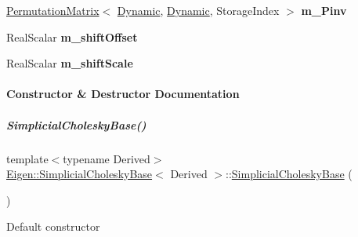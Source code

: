 \begin{DoxyCompactItemize}
\item 
\mbox{\label{group___sparse_cholesky___module_a764b103755408e66706abd16b8337a51}} 
\hyperlink{group___core___module_class_eigen_1_1_permutation_matrix}{Permutation\+Matrix}$<$ \hyperlink{namespace_eigen_ad81fa7195215a0ce30017dfac309f0b2}{Dynamic}, \hyperlink{namespace_eigen_ad81fa7195215a0ce30017dfac309f0b2}{Dynamic}, Storage\+Index $>$ {\bfseries m\+\_\+\+Pinv}
\item 
\mbox{\label{group___sparse_cholesky___module_a4e9e1aad9de3b3a66df7104d120a4331}} 
Real\+Scalar {\bfseries m\+\_\+shift\+Offset}
\item 
\mbox{\label{group___sparse_cholesky___module_ae7c80217fb99177ef501b19f75df6942}} 
Real\+Scalar {\bfseries m\+\_\+shift\+Scale}
\end{DoxyCompactItemize}


\paragraph{Constructor \& Destructor Documentation}
\mbox{\label{group___sparse_cholesky___module_a098baba1dbe07ca3a775c8df1f8a0e71}} 
\subparagraph{\texorpdfstring{Simplicial\+Cholesky\+Base()}{SimplicialCholeskyBase()}\hspace{0.1cm}{\footnotesize\ttfamily [1/2]}}
{\footnotesize\ttfamily template$<$typename Derived$>$ \\
\hyperlink{group___sparse_cholesky___module_class_eigen_1_1_simplicial_cholesky_base}{Eigen\+::\+Simplicial\+Cholesky\+Base}$<$ Derived $>$\+::\hyperlink{group___sparse_cholesky___module_class_eigen_1_1_simplicial_cholesky_base}{Simplicial\+Cholesky\+Base} (\begin{DoxyParamCaption}{ }\end{DoxyParamCaption})\hspace{0.3cm}{\ttfamily [inline]}}

Default constructor 

